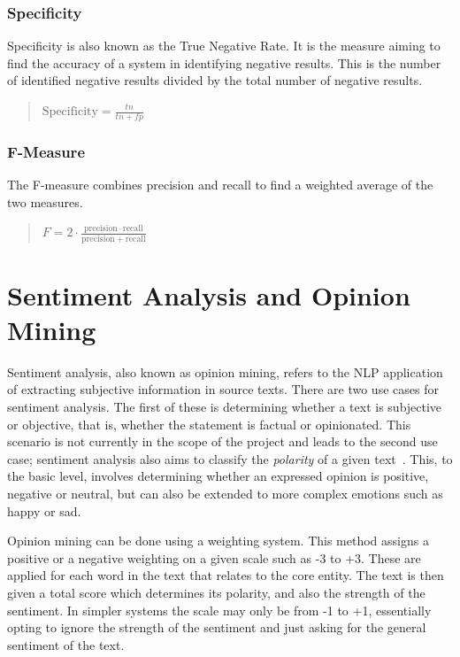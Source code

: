 \subsubsection{Specificity}
Specificity is also known as the True Negative Rate. It is the measure aiming to find the accuracy of a system in identifying negative results. This is the number of identified negative results divided by the total number of negative results.
\begin{quote}
$\mathrm{Specificity}=\frac{tn}{tn+fp}$
\end{quote}

\subsubsection{F-Measure}
The F-measure combines precision and recall to find a weighted average of the two measures.
\begin{quote}
$F = 2 \cdot \frac{\mathrm{precision} \cdot \mathrm{recall}}{\mathrm{precision} + \mathrm{recall}}$
\end{quote}

\section[Sentiment Analysis]{Sentiment Analysis and Opinion Mining}
\label{sec:back_sent}
Sentiment analysis, also known as opinion mining, refers to the NLP application of extracting subjective information in source texts. There are two use cases for sentiment analysis. The first of these is determining whether a text is subjective or objective, that is, whether the statement is factual or opinionated. This scenario is not currently in the scope of the project and leads to the second use case; sentiment analysis also aims to classify the \emph{polarity} of a given text~\cite{Pang+Lee}. This, to the basic level, involves determining whether an expressed opinion is positive, negative or neutral, but can also be extended to more complex emotions such as happy or sad.

Opinion mining can be done using a weighting system. This method assigns a positive or a negative weighting on a given scale such as -3 to +3. These are applied for each word in the text that relates to the core entity. The text is then given a total score which determines its polarity, and also the strength of the sentiment. In simpler systems the scale may only be from -1 to +1, essentially opting to ignore the strength of the sentiment and just asking for the general sentiment of the text.

